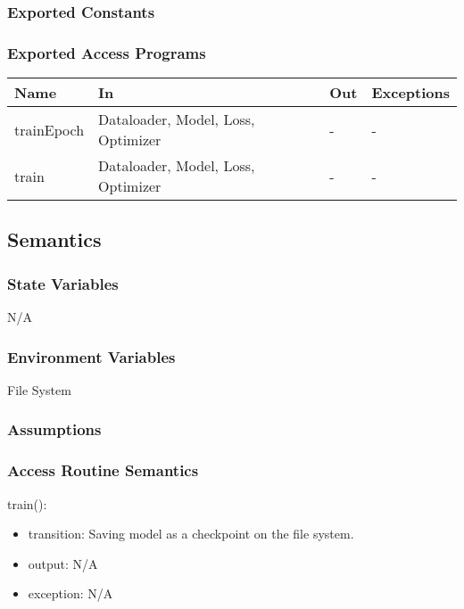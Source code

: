 \documentclass[12pt, titlepage]{article}
\begin{document}
\subsubsection{Exported Constants}



\subsubsection{Exported Access Programs}

\begin{center}
\begin{tabular}{p{2cm} p{4cm} p{4cm} p{2cm}}
\hline
\textbf{Name} & \textbf{In} & \textbf{Out} & \textbf{Exceptions} \\
\hline
trainEpoch & Dataloader, Model, Loss, Optimizer & - & - \\
\hline
train & Dataloader, Model, Loss, Optimizer & - & - \\
\hline
\end{tabular}
\end{center}

\subsection{Semantics}

\subsubsection{State Variables}

N/A

\subsubsection{Environment Variables}

File System

\subsubsection{Assumptions}



\subsubsection{Access Routine Semantics}


\noindent train():
\begin{itemize}
\item transition: Saving model as a checkpoint on the file system. 
\item output: N/A
\item exception: N/A
\end{itemize}
\end{document}
